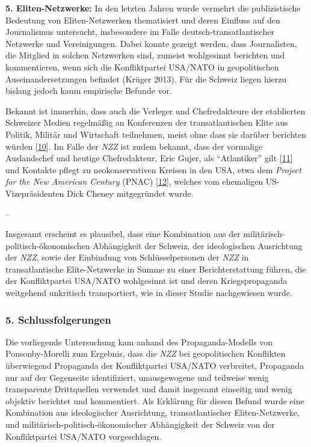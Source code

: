 \textbf{5. Eliten-Netzwerke:} In den letzten Jahren wurde vermehrt die
publizistische Bedeutung von Eliten-Netzwerken thematisiert und deren
Einfluss auf den Journalismus untersucht, insbesondere im Falle
deutsch-transatlantischer Netzwerke und Vereinigungen. Dabei konnte
gezeigt werden, dass Journalisten, die Mitglied in solchen Netzwerken
sind, zumeist wohlgesinnt berichten und kommentieren, wenn sich die
Konfliktpartei USA/NATO in geopolitischen Auseinandersetzungen befindet
(Krüger 2013). Für die Schweiz liegen hierzu bislang jedoch kaum
empirische Befunde vor.

Bekannt ist immerhin, dass auch die Verleger und Chefredakteure der
etablierten Schweizer Medien regelmäßig an Konferenzen der
transatlantischen Elite aus Politik, Militär und Wirtschaft teilnehmen,
meist ohne dass sie darüber berichten würden
{[}\protect\hyperlink{anm10}{10}{]}. Im Falle der \emph{NZZ} ist zudem
bekannt, dass der vormalige Auslandschef und heutige Chefredakteur, Eric
Gujer, als ``Atlantiker'' gilt {[}\protect\hyperlink{anm11}{11}{]} und
Kontakte pflegt zu neokonservativen Kreisen in den USA, etwa dem
\emph{Project for the New American Century} (PNAC)
{[}\protect\hyperlink{anm12}{12}{]}, welches vom ehemaligen
US-Vizepräsidenten Dick Cheney mitgegründet wurde.

--

Insgesamt erscheint es plausibel, dass eine Kombination aus der
militärisch-politisch-ökonomischen Abhängigkeit der Schweiz, der
ideologischen Ausrichtung der \emph{NZZ}, sowie der Einbindung von
Schlüssel­personen der \emph{NZZ} in transatlantische Elite-Netzwerke in
Summe zu einer Berichterstattung führen, die der Konfliktpartei USA/NATO
wohlgesinnt ist und deren Kriegspropaganda weitgehend unkritisch
transportiert, wie in dieser Studie nachgewiesen wurde.

\hypertarget{5-schlussfolgerungen}{%
\subsubsection{5. Schlussfolgerungen}\label{5-schlussfolgerungen}}

Die vorliegende Untersuchung kam anhand des Propaganda-Modells von
Ponsonby-Morelli zum Ergebnis, dass die \emph{NZZ} bei geopolitischen
Konflikten überwiegend Propaganda der Konfliktpartei USA/NATO
verbreitet, Propaganda nur auf der Gegenseite identifiziert,
unausgewogene und teilweise wenig transparente Drittquellen verwendet
und damit insgesamt einseitig und wenig objektiv berichtet und
kommentiert. Als Erklärung für diesen Befund wurde eine Kombination aus
ideologischer Ausrichtung, transatlantischer Eliten-Netzwerke, und
militärisch-politisch-ökonomischer Abhängigkeit der Schweiz von der
Konfliktpartei USA/NATO vorgeschlagen.

